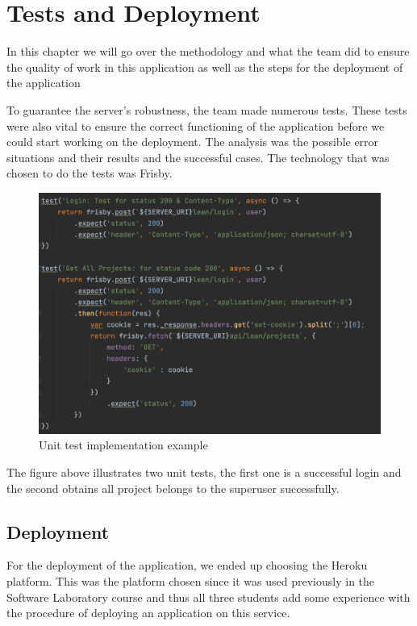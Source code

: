 \documentclass[a4paper,twoside,10pt]{report}
\begin{document}
\chapter{Tests and Deployment}
In this chapter we will go over the methodology and what the team did to ensure the quality of work in this application as well as the steps for the deployment of the application

To guarantee the server's robustness, the team made numerous tests. These tests were also vital to ensure the correct functioning of the application before we could start working on the deployment.  The analysis was the possible error situations and their results and the successful cases. The technology that was chosen to do the tests was Frisby.

\begin{figure}[h!]
\center
  \includegraphics[width=\textwidth]{tests.png}
\caption{Unit test implementation example}
\end{figure}

The figure above illustrates two unit tests, the first one is a successful login and the second obtains all project belongs to the superuser successfully.

\section{Deployment}
For the deployment of the application, we ended up choosing the Heroku platform. This was the platform chosen since it was used previously in the Software Laboratory course and thus all three students add some experience with the procedure of deploying an application on this service.
\end{document}

